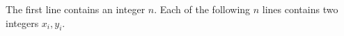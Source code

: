 The first line contains an integer $n$.
Each of the following $n$ lines contains two integers $x_i,y_i$.